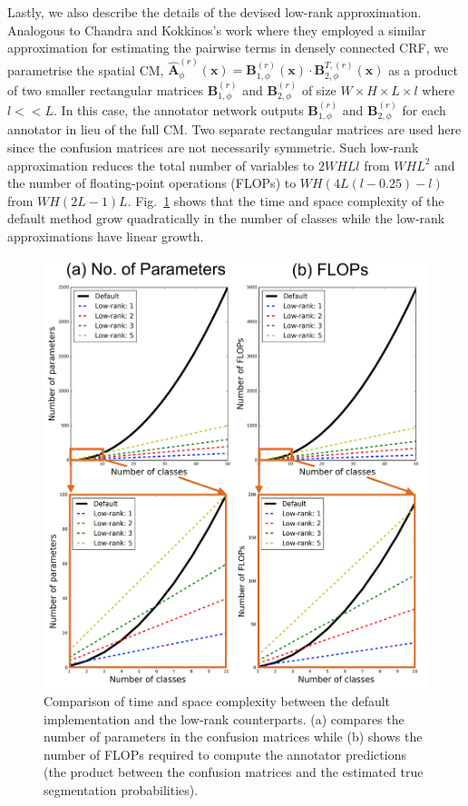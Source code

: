 Lastly, we also describe the details of the devised low-rank approximation. Analogous to Chandra and Kokkinos's work \cite{chandra2017dense} where they employed a similar approximation for estimating the pairwise terms in densely connected CRF,  we parametrise the spatial CM, $\hat{\textbf{A}}_{\phi}^{(r)}(\textbf{x}) = \textbf{B}_{1, \phi}^{(r)}(\textbf{x})\cdot\textbf{B}^{T,(r)}_{2, \phi}(\textbf{x})$ as a product of two smaller rectangular matrices $\textbf{B}_{1, \phi}^{(r)}$ and $\textbf{B}_{2, \phi}^{(r)}$ of size $W\times H \times L \times l$ where $l << L$. In this case, the annotator network outputs $\textbf{B}_{1, \phi}^{(r)}$ and $\textbf{B}_{2, \phi}^{(r)}$ for each annotator in lieu of the full CM. Two separate rectangular matrices are used here since the confusion matrices are not necessarily symmetric. Such low-rank approximation reduces the total number of variables to $2WHLl$ from $WHL^2$ and the number of floating-point operations (FLOPs) to $WH(4L(l - 0.25) - l)$ from $WH(2L-1)L$. Fig.~\ref{fig:low_rank_complexity} shows that the time and space complexity of the default method grow quadratically in the number of classes while the low-rank approximations have linear growth. 

\begin{figure}[H]
    \centering
    \includegraphics[width=0.5\linewidth]{chapter_8_neurips/picture20.png}
    \caption{\footnotesize Comparison of time and space complexity between the default implementation and the low-rank counterparts. (a) compares the number of parameters in the confusion matrices while (b) shows the number of FLOPs required to compute the annotator predictions (the product between the confusion matrices and the estimated true segmentation probabilities).}
    \label{fig:low_rank_complexity}
\end{figure}



